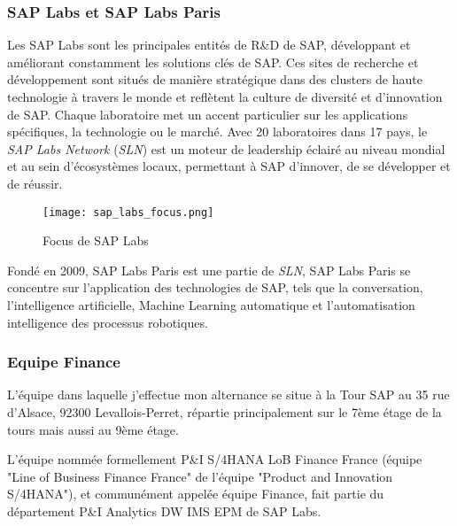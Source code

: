     \subsubsection{SAP Labs et SAP Labs Paris}
    
     Les SAP Labs sont les principales entités de R\&D de SAP, développant et améliorant constamment les solutions clés de SAP. Ces sites de recherche et développement sont situés de manière stratégique dans des clusters de haute technologie à travers le monde et reflètent la culture de diversité et d’innovation de SAP. Chaque laboratoire met un accent particulier sur les applications spécifiques, la technologie ou le marché. Avec 20 laboratoires dans 17 pays, le \textit{SAP Labs Network} (\textit{SLN}) est un moteur de leadership éclairé au niveau mondial et au sein d'écosystèmes locaux, permettant à SAP d'innover, de se développer et de réussir.
        \begin{figure}[H]
            \centering
            \texttt{[image: sap\_labs\_focus.png]}
            \caption{Focus de SAP Labs}
            \label{fig:SAP_Labs_Focus_label}
        \end{figure}
        
    \par Fondé en 2009, SAP Labs Paris est une partie de \textit{SLN}, SAP Labs Paris se concentre sur l'application des technologies de SAP, tels que la conversation, l'intelligence artificielle, Machine Learning automatique et l'automatisation intelligence des processus robotiques.
    
    \subsubsection{Equipe Finance}
        L'équipe dans laquelle j'effectue mon alternance se situe à la Tour SAP au 35 rue d'Alsace, 92300 Levallois-Perret, répartie principalement sur le 7ème étage de la tours mais aussi au 9ème étage.
        
        \par L'équipe nommée formellement P\&I S/4HANA LoB Finance France (équipe "Line of Business Finance France" de l’équipe "Product and Innovation S/4HANA"), et communément appelée équipe Finance, fait partie du département P\&I Analytics DW IMS EPM de SAP Labs.
